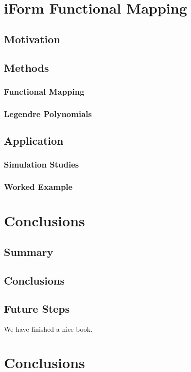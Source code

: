 \documentclass[]{book}
\theoremstyle{definition}
\theoremstyle{definition}
\theoremstyle{remark}
\begin{document}
\chapter{iForm Functional Mapping}\label{iform-functional-mapping}

\section{Motivation}\label{motivation-2}

\section{Methods}\label{methods-2}

\subsection{Functional Mapping}\label{functional-mapping}

\subsection{Legendre Polynomials}\label{legendre-polynomials}

\section{Application}\label{application-1}

\subsection{Simulation Studies}\label{simulation-studies}

\subsection{Worked Example}\label{worked-example}

\chapter{Conclusions}\label{conclusions}

\section{Summary}\label{summary}

\section{Conclusions}\label{conclusions-1}

\section{Future Steps}\label{future-steps}

We have finished a nice book.

\chapter*{Conclusions}\label{conclusions-2}


\end{document}
